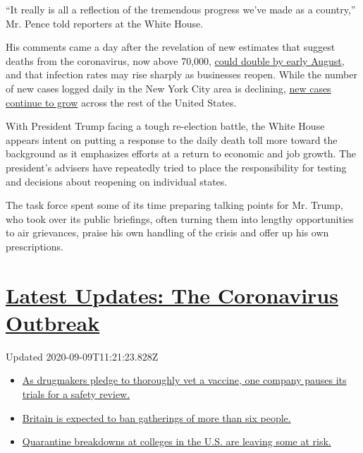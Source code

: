 ``It really is all a reflection of the tremendous progress we've made as
a country,'' Mr. Pence told reporters at the White House.

His comments came a day after the revelation of new estimates that
suggest deaths from the coronavirus, now above 70,000,
\href{https://covid19.healthdata.org/united-states-of-america}{could
double by early August}, and that infection rates may rise sharply as
businesses reopen. While the number of new cases logged daily in the New
York City area is declining,
\href{https://www.nytimes3xbfgragh.onion/2020/05/05/us/coronavirus-deaths-cases-united-states.html}{new
cases continue to grow} across the rest of the United States.

With President Trump facing a tough re-election battle, the White House
appears intent on putting a response to the daily death toll more toward
the background as it emphasizes efforts at a return to economic and job
growth. The president's advisers have repeatedly tried to place the
responsibility for testing and decisions about reopening on individual
states.

The task force spent some of its time preparing talking points for Mr.
Trump, who took over its public briefings, often turning them into
lengthy opportunities to air grievances, praise his own handling of the
crisis and offer up his own prescriptions.

\hypertarget{latest-updates-the-coronavirus-outbreak}{%
\section{\texorpdfstring{\href{https://www.nytimes3xbfgragh.onion/2020/09/09/world/covid-19-coronavirus.html?action=click\&pgtype=Article\&state=default\&region=MAIN_CONTENT_1\&context=storylines_live_updates}{Latest
Updates: The Coronavirus
Outbreak}}{Latest Updates: The Coronavirus Outbreak}}\label{latest-updates-the-coronavirus-outbreak}}

Updated 2020-09-09T11:21:23.828Z

\begin{itemize}
\tightlist
\item
  \href{https://www.nytimes3xbfgragh.onion/2020/09/09/world/covid-19-coronavirus.html?action=click\&pgtype=Article\&state=default\&region=MAIN_CONTENT_1\&context=storylines_live_updates\#link-70cea8bb}{As
  drugmakers pledge to thoroughly vet a vaccine, one company pauses its
  trials for a safety review.}
\item
  \href{https://www.nytimes3xbfgragh.onion/2020/09/09/world/covid-19-coronavirus.html?action=click\&pgtype=Article\&state=default\&region=MAIN_CONTENT_1\&context=storylines_live_updates\#link-780eaa2f}{Britain
  is expected to ban gatherings of more than six people.}
\item
  \href{https://www.nytimes3xbfgragh.onion/2020/09/09/world/covid-19-coronavirus.html?action=click\&pgtype=Article\&state=default\&region=MAIN_CONTENT_1\&context=storylines_live_updates\#link-11cec4c0}{Quarantine
  breakdowns at colleges in the U.S. are leaving some at risk.}
\end{itemize}


